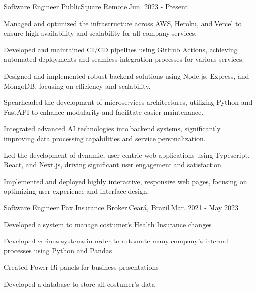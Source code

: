 

\begin{cventries}

\cventry
{Software Engineer} %
{PublicSquare} %
{Remote} %
{Jun. 2023 - Present} %
{
  \begin{cvitems} %
    \item {Managed and optimized the infrastructure across AWS, Heroku, and Vercel to ensure high availability and scalability for all company services.}
    \item{Developed and maintained CI/CD pipelines using GitHub Actions, achieving automated deployments and seamless integration processes for various services.}
    \item{Designed and implemented robust backend solutions using Node.js, Express, and MongoDB, focusing on efficiency and scalability.}
    \item{Spearheaded the development of microservices architectures, utilizing Python and FastAPI to enhance modularity and facilitate easier maintenance.}
    \item{Integrated advanced AI technologies into backend systems, significantly improving data processing capabilities and service personalization.}
    \item{Led the development of dynamic, user-centric web applications using Typescript, React, and Next.js, driving significant user engagement and satisfaction.}
    \item{Implemented and deployed highly interactive, responsive web pages, focusing on optimizing user experience and interface design.}
  \end{cvitems}
}



  \cventry
    {Software Engineer} %
    {Pax Insurance Broker} %
    {Ceará, Brazil} %
    {Mar. 2021 - May 2023} %
    {
      \begin{cvitems} %
        \item {Developed a system to manage costumer's Health Insurance changes}
        \item {Developed various systems in order to automate many company's internal processes using Python and Pandas}
        \item {Created Power Bi panels for business presentations}
        \item {Developed a database to store
        all costumer's data}
      \end{cvitems}
    }


\end{cventries}
